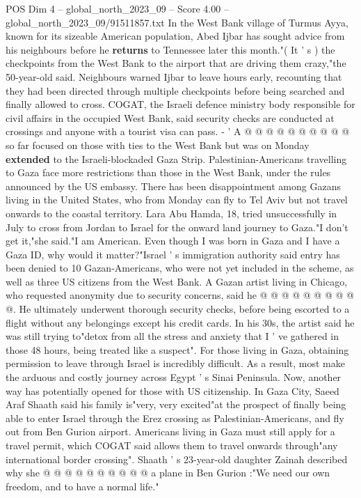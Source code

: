 \begin{textsample}{POS Dim 4 – global\_north\_2023\_09 – Score 4.00 – global\_north\_2023\_09/91511857.txt}
In the West Bank village of Turmus Ayya, known for its sizeable American population, Abed Ijbar has sought advice from his neighbours before he \textbf{returns} to Tennessee later this month."( It ' s ) the checkpoints from the West Bank to the airport that are driving them crazy,"the 50-year-old said.
Neighbours warned Ijbar to leave hours early, recounting that they had been directed through multiple checkpoints before being searched and finally allowed to cross.
COGAT, the Israeli defence ministry body responsible for civil affairs in the occupied West Bank, said security checks are conducted at crossings and anyone with a tourist visa can pass. - ' A @ @ @ @ @ @ @ @ @ @ so far focused on those with ties to the West Bank but was on Monday \textbf{extended} to the Israeli-blockaded Gaza Strip.
Palestinian-Americans travelling to Gaza face more restrictions than those in the West Bank, under the rules announced by the US embassy.
There has been disappointment among Gazans living in the United States, who from Monday can fly to Tel Aviv but not travel onwards to the coastal territory.
Lara Abu Hamda, 18, tried unsuccessfully in July to cross from Jordan to Israel for the onward land journey to Gaza."I don't get it,"she said."I am American.
Even though I was born in Gaza and I have a Gaza ID, why would it matter?"Israel ' s immigration authority said entry has been denied to 10 Gazan-Americans, who were not yet included in the scheme, as well as three US citizens from the West Bank.
A Gazan artist living in Chicago, who requested anonymity due to security concerns, said he @ @ @ @ @ @ @ @ @ @.
He ultimately underwent thorough security checks, before being escorted to a flight without any belongings except his credit cards.
In his 30s, the artist said he was still trying to"detox from all the stress and anxiety that I ' ve gathered in those 48 hours, being treated like a suspect".
For those living in Gaza, obtaining permission to leave through Israel is incredibly difficult.
As a result, most make the arduous and costly journey across Egypt ' s Sinai Peninsula.
Now, another way has potentially opened for those with US citizenship.
In Gaza City, Saeed Araf Shaath said his family is"very, very excited"at the prospect of finally being able to enter Israel through the Erez crossing as Palestinian-Americans, and fly out from Ben Gurion airport.
Americans living in Gaza must still apply for a travel permit, which COGAT said allows them to travel onwards through"any international border crossing".
Shaath ' s 23-year-old daughter Zainah described why she @ @ @ @ @ @ @ @ @ @ a plane in Ben Gurion :"We need our own freedom, and to have a normal life."

\end{textsample}
